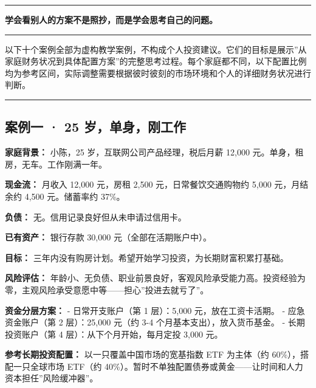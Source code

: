 \documentclass[a4paper,11pt,oneside,fontset=none,UTF8,zihao=-4]{ctexbook}
\begin{document}
\begin{center}{\color{dh-bronze}\rule{0.2\textwidth}{0.5pt}}\end{center}

\begin{dhquote}
\textbf{学会看别人的方案不是照抄，而是学会思考自己的问题。}
\end{dhquote}

\begin{center}{\color{dh-bronze}\rule{0.2\textwidth}{0.5pt}}\end{center}

以下十个案例全部为虚构教学案例，不构成个人投资建议。它们的目标是展示''从家庭财务状况到具体配置方案''的完整思考过程。每个家庭都不同，以下配置比例均为参考区间，实际调整需要根据彼时彼刻的市场环境和个人的详细财务状况进行判断。

\begin{center}{\color{dh-bronze}\rule{0.2\textwidth}{0.5pt}}\end{center}

\subsection{案例一 · 25
岁，单身，刚工作}\label{ux6848ux4f8bux4e00-25-ux5c81ux5355ux8eabux521aux5de5ux4f5c}

\textbf{家庭背景：} 小陈，25 岁，互联网公司产品经理，税后月薪 12,000
元。单身，租房，无车。工作刚满一年。

\textbf{现金流：} 月收入 12,000 元，房租 2,500 元，日常餐饮交通购物约
5,000 元，月结余约 4,500 元。储蓄率约 37\%。

\textbf{负债：} 无。信用记录良好但从未申请过信用卡。

\textbf{已有资产：} 银行存款 30,000 元（全部在活期账户中）。

\textbf{目标：}
三年内没有购房计划。希望开始学习投资，为长期财富积累打基础。

\textbf{风险评估：}
年龄小、无负债、职业前景良好，客观风险承受能力高。投资经验为零，主观风险承受意愿中等------担心''投进去就亏了''。

\textbf{资金分层方案：} - 日常开支账户（第 1 层）：5,000
元，放在工资卡活期。 - 应急资金账户（第 2 层）：25,000 元（约 3-4
个月基本支出），放入货币基金。 - 长期投资账户（第 4
层）：从下个月开始，每月定投 3,000 元。

\textbf{参考长期投资配置：} 以一只覆盖中国市场的宽基指数 ETF 为主体（约
60\%），搭配一只全球市场 ETF（约
40\%）。暂时不单独配置债券或黄金------让时间和人力资本担任''风险缓冲器''。
\end{document}

